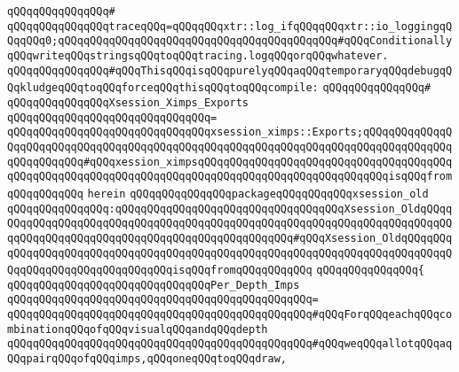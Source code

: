 \verb|qQQqqQQqqQQqqQQq#|\newline
\verb|qQQqqQQqqQQqqQQqtraceqQQq=qQQqqQQqxtr::log_ifqQQqqQQqxtr::io_loggingqQQqqQQq0;qQQqqQQqqQQqqQQqqQQqqQQqqQQqqQQqqQQqqQQqqQQq#qQQqConditionallyqQQqwriteqQQqstringsqQQqtoqQQqtracing.logqQQqorqQQqwhatever.|\newline
\newline
\verb|qQQqqQQqqQQqqQQq#qQQqThisqQQqisqQQqpurelyqQQqaqQQqtemporaryqQQqdebugqQQqkludgeqQQqtoqQQqforceqQQqthisqQQqtoqQQqcompile:|\newline
\verb|qQQqqQQqqQQqqQQq#|\newline
\verb|qQQqqQQqqQQqqQQqXsession_Ximps_Exports|\newline
\verb|qQQqqQQqqQQqqQQqqQQqqQQqqQQqqQQq=|\newline
\verb|qQQqqQQqqQQqqQQqqQQqqQQqqQQqqQQqxsession_ximps::Exports;qQQqqQQqqQQqqQQqqQQqqQQqqQQqqQQqqQQqqQQqqQQqqQQqqQQqqQQqqQQqqQQqqQQqqQQqqQQqqQQqqQQqqQQqqQQqqQQq#qQQqxession_ximpsqQQqqQQqqQQqqQQqqQQqqQQqqQQqqQQqqQQqqQQqqQQqqQQqqQQqqQQqqQQqqQQqqQQqqQQqqQQqqQQqqQQqqQQqqQQqqQQqqQQqisqQQqfromqQQqqQQqqQQq|\newline
\newline
\verb|herein|\newline
\newline
\newline
\verb|qQQqqQQqqQQqqQQqpackageqQQqqQQqqQQqxsession_old|\newline
\verb|qQQqqQQqqQQqqQQq:qQQqqQQqqQQqqQQqqQQqqQQqqQQqqQQqqQQqXsession_OldqQQqqQQqqQQqqQQqqQQqqQQqqQQqqQQqqQQqqQQqqQQqqQQqqQQqqQQqqQQqqQQqqQQqqQQqqQQqqQQqqQQqqQQqqQQqqQQqqQQqqQQqqQQqqQQqqQQqqQQq#qQQqXsession_OldqQQqqQQqqQQqqQQqqQQqqQQqqQQqqQQqqQQqqQQqqQQqqQQqqQQqqQQqqQQqqQQqqQQqqQQqqQQqqQQqqQQqqQQqqQQqqQQqqQQqqQQqisqQQqfromqQQqqQQqqQQq|\newline
\verb|qQQqqQQqqQQqqQQq{|\newline
\verb|qQQqqQQqqQQqqQQqqQQqqQQqqQQqqQQqPer_Depth_Imps|\newline
\verb|qQQqqQQqqQQqqQQqqQQqqQQqqQQqqQQqqQQqqQQqqQQqqQQq=|\newline
\verb|qQQqqQQqqQQqqQQqqQQqqQQqqQQqqQQqqQQqqQQqqQQqqQQq#qQQqForqQQqeachqQQqcombinationqQQqofqQQqvisualqQQqandqQQqdepth|\newline
\verb|qQQqqQQqqQQqqQQqqQQqqQQqqQQqqQQqqQQqqQQqqQQqqQQq#qQQqweqQQqallotqQQqaqQQqpairqQQqofqQQqimps,qQQqoneqQQqtoqQQqdraw,|\newline
